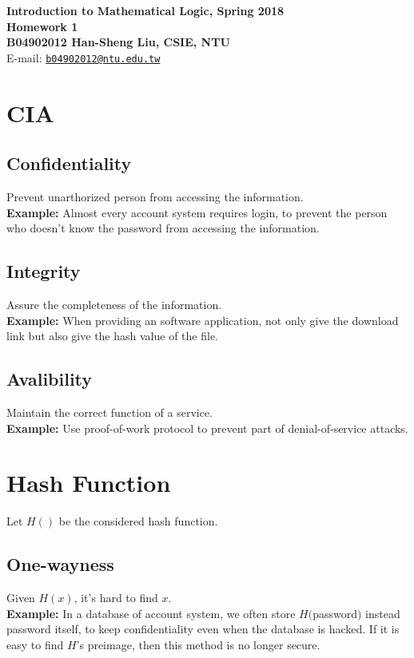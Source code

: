 \documentclass[12pt,a4paper]{article}
\begin{document}
\begin{center}
\textbf{\Large Introduction to Mathematical Logic, Spring 2018\\}
\textbf{\Large Homework 1\\} 
\vspace{5pt}
\textbf{B04902012 Han-Sheng Liu, CSIE, NTU}\\
E-mail: \href{mailto:b04902012@ntu.edu.tw}{\texttt{b04902012@ntu.edu.tw}}\\

\end{center}
\vspace{10pt}
\section{CIA}
\subsection{Confidentiality}
    Prevent unarthorized person from accessing the information.\\
    \textbf{Example:} Almost every account system requires login, to prevent the person who doesn't know the password from accessing the information.

\subsection{Integrity}
    Assure the completeness of the information.\\
    \textbf{Example:} When providing an software application, not only give the download link but also give the hash value of the file.

\subsection{Avalibility}
    Maintain the correct function of a service.\\
    \textbf{Example:} Use proof-of-work protocol to prevent part of denial-of-service attacks.

\section{Hash Function}
Let $H()$ be the considered hash function.
\subsection{One-wayness}
    Given $H(x)$, it's hard to find $x$.\\
    \textbf{Example:} In a database of account system, we often store $H($password$)$ instead password itself, to keep confidentiality even when the database is hacked. If it is easy to find $H$'s preimage, then this method is no longer secure. 
\end{document}
